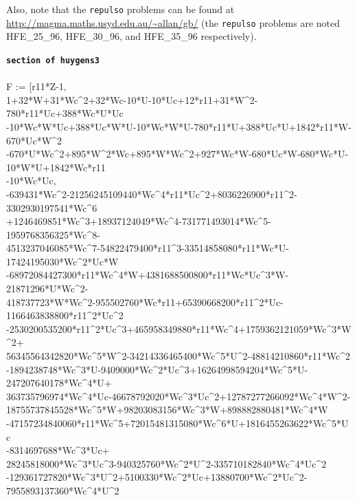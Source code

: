 \documentclass[letterpaper,12pt,titlepage,oneside,final]{book}
\newenvironment{codefont}{\footnotesize\ttfamily}{\par}
\begin{document}
\begin{appendices}
Also, note that the \texttt{repulso} problems can be found at \url{http://magma.maths.usyd.edu.au/~allan/gb/} (the \texttt{repulso} problems are noted  HFE\_25\_96, HFE\_30\_96, and HFE\_35\_96 respectively).

\singlespacing

\noindent\textbf{\texttt{section of huygens3}}\\\\
\noindent\begin{codefont}
 F := [r11*Z-1,\\
1+32*W+31*Wc\^{}2+32*Wc-10*U-10*Uc+12*r11+31*W\^{}2-780*r11*Uc+388*Wc*U*Uc\\
-10*Wc*W*Uc+388*Uc*W*U-10*Wc*W*U-780*r11*U+388*Uc*U+1842*r11*W-670*Uc*W\^{}2\\
-670*U*Wc\^{}2+895*W\^{}2*Wc+895*W*Wc\^{}2+927*Wc*W-680*Uc*W-680*Wc*U-10*W*U+1842*Wc*r11\\
-10*Wc*Uc,\\
-639431*Wc\^{}2-21256245109440*Wc\^{}4*r11*Uc\^{}2+8036226900*r11\^{}2-3302930197541*Wc\^{}6\\
+1246469851*Wc\^{}3+18937124049*Wc\^{}4-731771493014*Wc\^{}5-1959768356325*Wc\^{}8-\\
4513237046085*Wc\^{}7-54822479400*r11\^{}3-33514858080*r11*Wc*U-17424195030*Wc\^{}2*Uc*W\\
-68972084427300*r11*Wc\^{}4*W+4381688500800*r11*Wc*Uc\^{}3*W-21871296*U*Wc\^{}2-\\
418737723*W*Wc\^{}2-955502760*Wc*r11+65390668200*r11\^{}2*Uc-1166463838800*r11\^{}2*Uc\^{}2\\
-2530200535200*r11\^{}2*Uc\^{}3+465958349880*r11*Wc\^{}4+1759362121059*Wc\^{}3*W\^{}2+\\
56345564342820*Wc\^{}5*W\^{}2-34214336465400*Wc\^{}5*U\^{}2-48814210860*r11*Wc\^{}2\\
-1894238748*Wc\^{}3*U-9409000*Wc\^{}2*Uc\^{}3+16264998594204*Wc\^{}5*U-247207640178*Wc\^{}4*U+\\
363735796974*Wc\^{}4*Uc-46678792020*Wc\^{}3*Uc\^{}2+12787277266092*Wc\^{}4*W\^{}2-\\
18755737845528*Wc\^{}5*W+98203083156*Wc\^{}3*W+898882880481*Wc\^{}4*W\\
-47157234840060*r11*Wc\^{}5+72015481315080*Wc\^{}6*U+1816455263622*Wc\^{}5*Uc\\
-8314697688*Wc\^{}3*Uc+\\
28245818000*Wc\^{}3*Uc\^{}3-940325760*Wc\^{}2*U\^{}2-335710182840*Wc\^{}4*Uc\^{}2\\
-129361727820*Wc\^{}3*U\^{}2+5100330*Wc\^{}2*Uc+13880700*Wc\^{}2*Uc\^{}2-7955893137360*Wc\^{}4*U\^{}2\\

\end{codefont}
\end{appendices}
\end{document}
